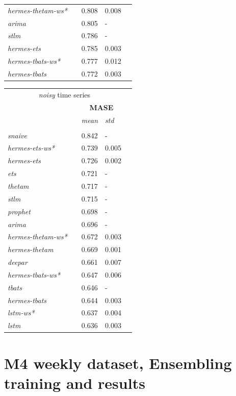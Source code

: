 \documentclass[10pt]{article} %
\begin{document}
\begin{table}
{\begin{tabular}{l||llll}
	 \textit{hermes-thetam-ws*} && 0.808 & 0.008\\ 
	 \textit{arima} && 0.805 & -\\ 
	 \textit{stlm} && 0.786 & -\\ 
	 \textit{hermes-ets} && 0.785 & 0.003\\ 
	 \textit{hermes-tbats-ws*} && 0.777 & 0.012\\ 
	 \textit{hermes-tbats} && 0.772 & 0.003\\ 
  \end{tabular}\hspace{1cm}
  \begin{tabular}{l||llll}
   \multicolumn{4}{c}{\textit{noisy} time series}\\
   &&\multicolumn{2}{c}{\textbf{MASE}} \\
    &&  \textit{mean}  & \textit{std}  \\
	\hline
	 &&& \\
     \textit{snaive} && 0.842 & -\\ 
	 \textit{hermes-ets-ws*} && 0.739 & 0.005\\ 
	 \textit{hermes-ets} && 0.726 & 0.002\\ 
	 \textit{ets} && 0.721 & -\\ 
	 \textit{thetam} && 0.717 & -\\ 
	 \textit{stlm} && 0.715 & -\\ 
	 \textit{prophet} && 0.698 & -\\ 
	 \textit{arima} && 0.696 & -\\ 
	 \textit{hermes-thetam-ws*} && 0.672 & 0.003\\ 
	 \textit{hermes-thetam} && 0.669 & 0.001\\ 
	 \textit{deepar} && 0.661 & 0.007\\ 
	 \textit{hermes-tbats-ws*} && 0.647 & 0.006\\ 
	 \textit{tbats} && 0.646 & -\\ 
	 \textit{hermes-tbats} && 0.644 & 0.003\\ 
	 \textit{lstm-ws*} && 0.637 & 0.004\\ 
	 \textit{lstm} && 0.636 & 0.003\\
  \end{tabular}
 }
 \label{tab:fashionsubsample}
\end{table}

\section{M4 weekly dataset, Ensembling training and results}
\end{document}
